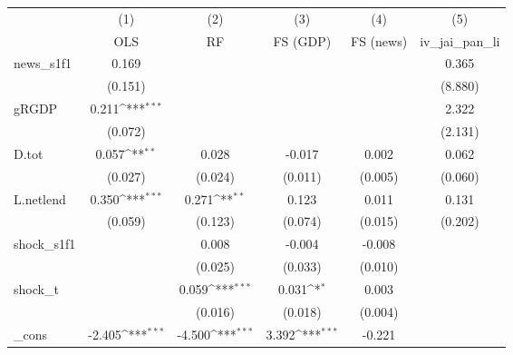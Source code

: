 {
\def\sym#1{\ifmmode^{#1}\else\(^{#1}\)\fi}
\begin{tabular}{l*{5}{c}}
\toprule
            &\multicolumn{1}{c}{(1)}&\multicolumn{1}{c}{(2)}&\multicolumn{1}{c}{(3)}&\multicolumn{1}{c}{(4)}&\multicolumn{1}{c}{(5)}\\
            &\multicolumn{1}{c}{OLS}&\multicolumn{1}{c}{RF}&\multicolumn{1}{c}{FS (GDP)}&\multicolumn{1}{c}{FS (news)}&\multicolumn{1}{c}{iv\_jai\_pan\_li}\\
\midrule
news\_s1f1   &       0.169         &                     &                     &                     &       0.365         \\
            &     (0.151)         &                     &                     &                     &     (8.880)         \\
\addlinespace
gRGDP       &       0.211\sym{***}&                     &                     &                     &       2.322         \\
            &     (0.072)         &                     &                     &                     &     (2.131)         \\
\addlinespace
D.tot       &       0.057\sym{**} &       0.028         &      -0.017         &       0.002         &       0.062         \\
            &     (0.027)         &     (0.024)         &     (0.011)         &     (0.005)         &     (0.060)         \\
\addlinespace
L.netlend   &       0.350\sym{***}&       0.271\sym{**} &       0.123         &       0.011         &       0.131         \\
            &     (0.059)         &     (0.123)         &     (0.074)         &     (0.015)         &     (0.202)         \\
\addlinespace
shock\_s1f1  &                     &       0.008         &      -0.004         &      -0.008         &                     \\
            &                     &     (0.025)         &     (0.033)         &     (0.010)         &                     \\
\addlinespace
shock\_t     &                     &       0.059\sym{***}&       0.031\sym{*}  &       0.003         &                     \\
            &                     &     (0.016)         &     (0.018)         &     (0.004)         &                     \\
\addlinespace
\_cons      &      -2.405\sym{***}&      -4.500\sym{***}&       3.392\sym{***}&      -0.221         &                     \\

\end{tabular}}
